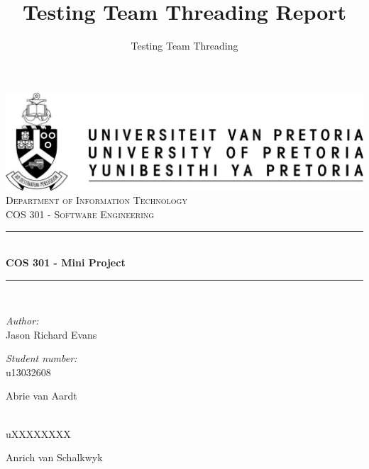 \documentclass[a4paper,12pt]{report}
\author{Testing Team Threading}
\title{ Testing Team Threading Report}
\newcommand{\HRule}{\rule{\linewidth}{0.5mm}}
\begin{document}
\setlength{\parskip}{6pt}

\begin{titlepage}

\begin{center}
\includegraphics[width=1\textwidth]{./up-logo.jpg}\\[0.4cm]    
\textsc{\LARGE Department of Information Technology}\\[1.5cm]
\textsc{\Large COS 301 - Software Engineering}\\[0.5cm]
\HRule \\[0.4cm]
{ \huge \bfseries COS 301 - Mini Project}\\[0.4cm]
\HRule \\[0.4cm]
\begin{minipage}{0.4\textwidth}
\begin{flushleft} \large
\emph{Author:}\\
Jason {Richard Evans}
\end{flushleft}
\end{minipage}
\begin{minipage}{0.4\textwidth}
\begin{flushright} \large
\emph{Student number:} \\
u13032608
\end{flushright}
\end{minipage}
\begin{minipage}{0.4\textwidth}
\begin{flushleft} \large
Abrie {van Aardt}
\end{flushleft}
\end{minipage}
\begin{minipage}{0.4\textwidth}
\begin{flushright} \large
\emph{} \\
uXXXXXXXX
\end{flushright}
\end{minipage}
\begin{minipage}{0.4\textwidth}
\begin{flushleft} \large
Anrich {van Schalkwyk}
\end{flushleft}

\end{minipage}
\end{center}
\end{titlepage}
\end{document}
